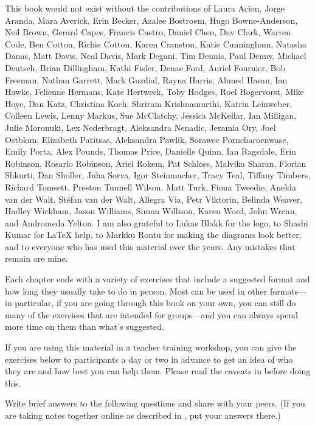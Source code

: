 
This book would not exist without the contributions of
Laura Acion,
Jorge Aranda,
Mara Averick,
Erin Becker,
Azalee Bostroem,
Hugo Bowne-Anderson,
Neil Brown,
Gerard Capes,
Francis Castro,
Daniel Chen,
Dav Clark,
Warren Code,
Ben Cotton,
Richie Cotton,
Karen Cranston,
Katie Cunningham,
Natasha Danas,
Matt Davis,
Neal Davis,
Mark Degani,
Tim Dennis,
Paul Denny,
Michael Deutsch,
Brian Dillingham,
Kathi Fisler,
Denae Ford,
Auriel Fournier,
Bob Freeman,
Nathan Garrett,
Mark Guzdial,
Rayna Harris,
Ahmed Hasan,
Ian Hawke,
Felienne Hermans,
Kate Hertweck,
Toby Hodges,
Roel Hogervorst,
Mike Hoye,
Dan Katz,
Christina Koch,
Shriram Krishnamurthi,
Katrin Leinweber,
Colleen Lewis,
Lenny Markus,
Sue McClatchy,
Jessica McKellar,
Ian Milligan,
Julie Moronuki,
Lex Nederbragt,
Aleksandra Nenadic,
Jeramia Ory,
Joel Ostblom,
Elizabeth Patitsas,
Aleksandra Pawlik,
Sorawee Porncharoenwase,
Emily Porta,
Alex Pounds,
Thomas Price,
Danielle Quinn,
Ian Ragsdale,
Erin Robinson,
Rosario Robinson,
Ariel Rokem,
Pat Schloss,
Malvika Sharan,
Florian Shkurti,
Dan Sholler,
Juha Sorva,
Igor Steinmacher,
Tracy Teal,
Tiffany Timbers,
Richard Tomsett,
Preston Tunnell Wilson,
Matt Turk,
Fiona Tweedie,
Anelda van der Walt,
Stéfan van der Walt,
Allegra Via,
Petr Viktorin,
Belinda Weaver,
Hadley Wickham,
Jason Williams,
Simon Willison,
Karen Word,
John Wrenn,
and Andromeda Yelton.
I am also grateful to Lukas Blakk for the logo,
to Shashi Kumar for LaTeX help,
to Markku Rontu for making the diagrams look better,
and to everyone who has used this material over the years.
Any mistakes that remain are mine.


Each chapter ends with a variety of exercises that include a suggested format
and how long they usually take to do in person.
Most can be used in other formats---in particular,
if you are going through this book on your own,
you can still do many of the exercises that are intended for groups---and
you can always spend more time on them than what's suggested.

If you are using this material in a teacher training workshop,
you can give the exercises below to participants a day or two in advance
to get an idea of who they are and how best you can help them.
Please read the caveats in  before doing this.


Write brief answers to the following questions and share with your peers.
(If you are taking notes together online as described in ,
put your answers there.)

